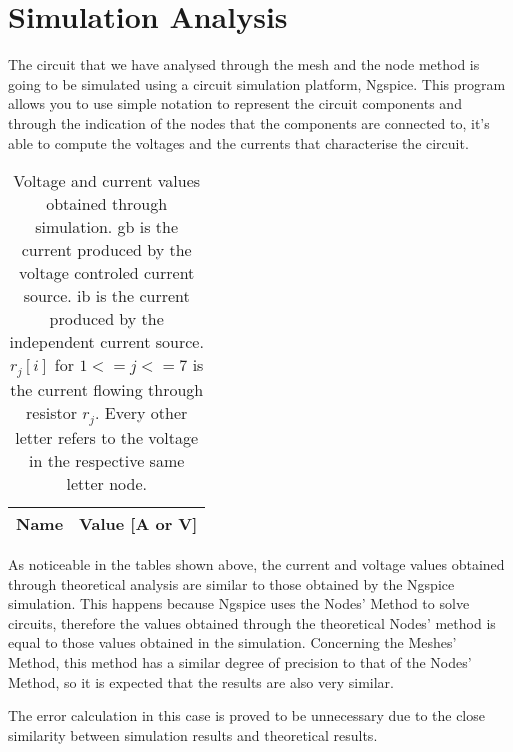 \section{Simulation Analysis}
\label{sec:simulation}

The circuit that we have analysed through the mesh and the node method is going to be simulated using a circuit simulation platform, Ngspice. This program allows you to use simple notation to represent the circuit components and through the indication of the nodes that the components are connected to, it's able to compute the voltages and the currents that characterise the circuit.

\begin{table}[h]
  \centering
  \begin{tabular}{|l|r|}
    \hline    
    {\bf Name} & {\bf Value [A or V]} \\ \hline
    
  \end{tabular}
  \caption{Voltage and current values obtained through simulation. gb is the current produced by the voltage controled current source. ib is the current produced by the independent current source. $r_j[i]$ for $1<=j<=7$ is the current flowing through resistor $r_j$. Every other letter refers to the voltage in the respective same letter node.}
  \label{tab:op}
\end{table}


As noticeable in the tables shown above, the current and voltage values obtained through theoretical analysis are similar to those obtained by the Ngspice simulation. This happens because Ngspice uses the Nodes' Method to solve circuits, therefore the values obtained through the theoretical Nodes' method is equal to those values obtained in the simulation. Concerning the Meshes' Method, this method has a similar degree of precision to that of the Nodes' Method, so it is expected that the results are also very similar.

The error calculation in this case is proved to be unnecessary due to the close similarity between simulation results and theoretical results.
